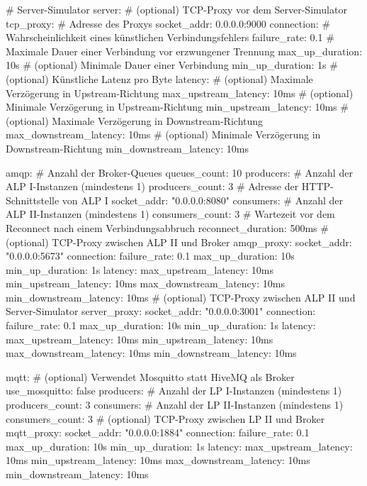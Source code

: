\newpage

\begin{yamlcode}[title={Allgemeiner Teil}]
# Server-Simulator
server:
  # (optional) TCP-Proxy vor dem Server-Simulator
  tcp_proxy:
    # Adresse des Proxys
    socket_addr: 0.0.0.0:9000
    connection:
      # Wahrscheinlichkeit eines künstlichen Verbindungsfehlers
      failure_rate: 0.1
      # Maximale Dauer einer Verbindung vor erzwungener Trennung
      max_up_duration: 10s
      # (optional) Minimale Dauer einer Verbindung
      min_up_duration: 1s
      # (optional) Künstliche Latenz pro Byte
      latency:
        # (optional) Maximale Verzögerung in Upstream-Richtung
        max_upstream_latency: 10ms
        # (optional) Minimale Verzögerung in Upstream-Richtung
        min_upstream_latency: 10ms
        # (optional) Maximale Verzögerung in Downstream-Richtung
        max_downstream_latency: 10ms
        # (optional) Minimale Verzögerung in Downstream-Richtung
        min_downstream_latency: 10ms
\end{yamlcode}

\newpage

\begin{yamlcode}[title={ALPS-spezifischer Teil}]
amqp:
  # Anzahl der Broker-Queues
  queues_count: 10
  producers:
    # Anzahl der ALP I-Instanzen (mindestens 1)
    producers_count: 3
    # Adresse der HTTP-Schnittstelle von ALP I
    socket_addr: "0.0.0.0:8080"
  consumers:
    # Anzahl der ALP II-Instanzen (mindestens 1)
    consumers_count: 3
    # Wartezeit vor dem Reconnect nach einem Verbindungsabbruch
    reconnect_duration: 500ms
    # (optional) TCP-Proxy zwischen ALP II und Broker
    amqp_proxy:
      socket_addr: "0.0.0.0:5673"
      connection:
        failure_rate: 0.1
        max_up_duration: 10s
        min_up_duration: 1s
        latency:
          max_upstream_latency: 10ms
          min_upstream_latency: 10ms
          max_downstream_latency: 10ms
          min_downstream_latency: 10ms
    # (optional) TCP-Proxy zwischen ALP II und Server-Simulator
    server_proxy:
      socket_addr: "0.0.0.0:3001"
      connection:
        failure_rate: 0.1
        max_up_duration: 10s
        min_up_duration: 1s
        latency:
          max_upstream_latency: 10ms
          min_upstream_latency: 10ms
          max_downstream_latency: 10ms
          min_downstream_latency: 10ms
\end{yamlcode}

\newpage

\begin{yamlcode}[title={LPS-spezifischer Teil}]
mqtt:
  # (optional) Verwendet Mosquitto statt HiveMQ als Broker
  use_mosquitto: false
  producers:
    # Anzahl der LP I-Instanzen (mindestens 1)
    producers_count: 3
  consumers:
    # Anzahl der LP II-Instanzen (mindestens 1)
    consumers_count: 3
    # (optional) TCP-Proxy zwischen LP II und Broker
    mqtt_proxy:
      socket_addr: "0.0.0.0:1884"
      connection:
        failure_rate: 0.1
        max_up_duration: 10s
        min_up_duration: 1s
        latency:
          max_upstream_latency: 10ms
          min_upstream_latency: 10ms
          max_downstream_latency: 10ms
          min_downstream_latency: 10ms
\end{yamlcode}

